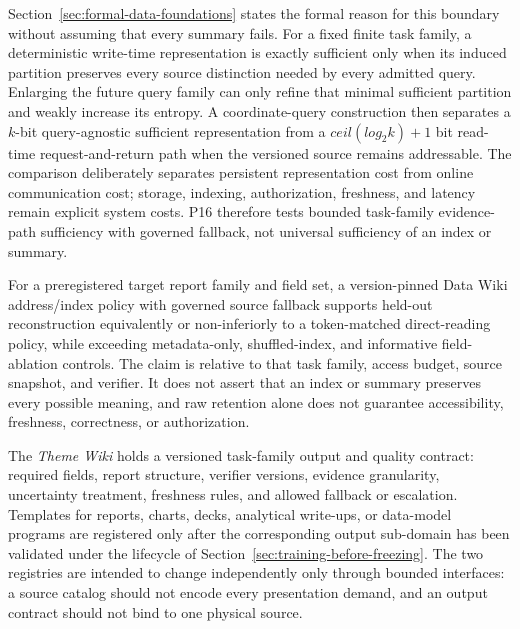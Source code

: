 Section~\ref{sec:formal-data-foundations} states the formal reason for this boundary without assuming that every summary fails. For a fixed finite task family, a deterministic write-time representation is exactly sufficient only when its induced partition preserves every source distinction needed by every admitted query. Enlarging the future query family can only refine that minimal sufficient partition and weakly increase its entropy. A coordinate-query construction then separates a $k$-bit query-agnostic sufficient representation from a $ceil(log_2 k)+1$ bit read-time request-and-return path when the versioned source remains addressable. The comparison deliberately separates persistent representation cost from online communication cost; storage, indexing, authorization, freshness, and latency remain explicit system costs. P16 therefore tests bounded task-family evidence-path sufficiency with governed fallback, not universal sufficiency of an index or summary.

\begin{proposition}
\label{prop:p16}
For a preregistered target report family and field set, a version-pinned Data Wiki address/index policy with governed source fallback supports held-out reconstruction equivalently or non-inferiorly to a token-matched direct-reading policy, while exceeding metadata-only, shuffled-index, and informative field-ablation controls. The claim is relative to that task family, access budget, source snapshot, and verifier. It does not assert that an index or summary preserves every possible meaning, and raw retention alone does not guarantee accessibility, freshness, correctness, or authorization.
\end{proposition}

The \textit{Theme Wiki} holds a versioned task-family output and quality contract: required fields, report structure, verifier versions, evidence granularity, uncertainty treatment, freshness rules, and allowed fallback or escalation. Templates for reports, charts, decks, analytical write-ups, or data-model programs are registered only after the corresponding output sub-domain has been validated under the lifecycle of Section~\ref{sec:training-before-freezing}. The two registries are intended to change independently only through bounded interfaces: a source catalog should not encode every presentation demand, and an output contract should not bind to one physical source.

